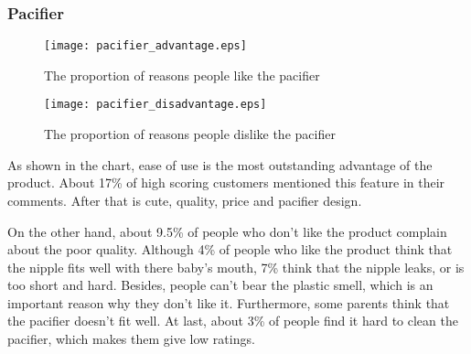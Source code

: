 \documentclass{mcmthesis}
\begin{document}
	\subsubsection{Pacifier}
	\begin{figure}[H]
		\begin{minipage}[t]{0.5\textwidth}
			\centering
			\texttt{[image: pacifier\_advantage.eps]}
			\caption{The proportion of reasons people like the pacifier\label{fig:1}}
		\end{minipage}
		\qquad
		\begin{minipage}[t]{0.5\textwidth}
			\centering
			\texttt{[image: pacifier\_disadvantage.eps]}
			\caption{The proportion of reasons people dislike the pacifier\label{fig:2}}
		\end{minipage}
	\end{figure}
	\begin{flushleft}
		As shown in the chart, ease of use is the most outstanding advantage of the product. About 17\% of high scoring customers mentioned this feature in their comments. After that is cute, quality, price and pacifier design.
		
	\end{flushleft}
	\begin{flushleft}
		On the other hand, about 9.5\% of people who don't like the product complain
		about the poor quality. Although 4\% of people who like the product think that the nipple fits well with there baby's mouth, 7\%  think that the nipple leaks, or is too short and hard. Besides, people can't bear the plastic smell, which is an important reason why they don't like it. Furthermore, some parents think that the pacifier doesn't fit well. At last, about 3\% of people find it hard to clean the pacifier, which makes them give low ratings.
	\end{flushleft}
	
	
\end{document}
